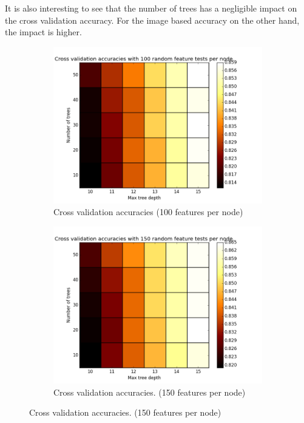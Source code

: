 It is also interesting to see that the number of trees has a negligible impact on the cross validation accuracy.
For the image based accuracy on the other hand, the impact is higher.


\begin{figure}
	\centering
	\begin{subfigure}{0.4\textwidth}
		\centering
		\includegraphics[width=\textwidth]{plots/heatmap_xacc_100.png}
		\caption{\scriptsize Cross validation accuracies (100 features per node)}
		\label{subfig:result_heatmap_xacc_100}
	\end{subfigure}
  \hspace{0.05\textwidth}
	\begin{subfigure}{0.4\textwidth}
		\centering
		\includegraphics[width=\textwidth]{plots/heatmap_xacc_150.png}
		\caption{\scriptsize Cross validation accuracies. (150 features per node)}
		\label{subfig:result_heatmap_xacc_150}
	\end{subfigure}
  

\end{figure}
